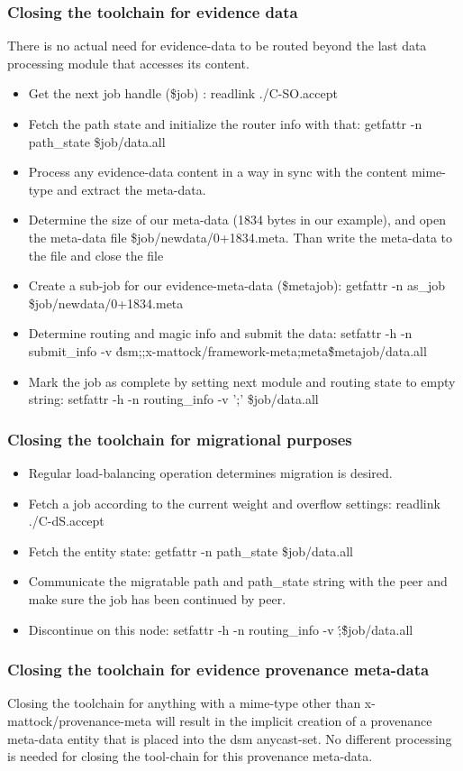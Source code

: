 \subsubsection{Closing the toolchain for evidence data}
There is no actual need for evidence-data to be routed beyond the last data processing module that accesses its content.
\begin{itemize}
\item Get the next job handle (\$job) : readlink \@./C-SO.accept
\item Fetch the path state and initialize the router info with that: getfattr -n path\_state \$job/data.all
\item Process any evidence-data content in a way in sync with the content mime-type and extract the meta-data.
\item Determine the size of our meta-data (1834 bytes in our example), and open the meta-data file \$job/newdata/0+1834.meta. Than write the meta-data to the file and close the file
\item Create a sub-job for our evidence-meta-data (\$metajob): getfattr -n as\_job \$job/newdata/0+1834.meta
\item Determine routing and magic info and submit the data: setfattr -h -n submit\_info -v \'dsm;;x-mattock/framework-meta;meta\' \$metajob/data.all
\item Mark the job as complete by setting next module and routing state to empty string:  setfattr -h -n routing\_info -v ';' \$job/data.all
\end{itemize}
\subsubsection{Closing the toolchain for migrational purposes}
\begin{itemize}
\item Regular load-balancing operation determines migration is desired.
\item Fetch a job according to the current weight and overflow settings: readlink \@./C-dS.accept
\item Fetch the entity state: getfattr -n path\_state \$job/data.all
\item Communicate the migratable path and path\_state string with the peer and make sure the job has been continued by peer.
\item Discontinue on this node: setfattr -h -n routing\_info -v \';\' \$job/data.all
\end{itemize}
\subsubsection{Closing the toolchain for evidence provenance meta-data}
Closing the toolchain for anything with a mime-type other than x-mattock/provenance-meta will result in the implicit creation of a provenance meta-data entity that is placed into the dsm anycast-set. No different processing is needed for closing the tool-chain for this provenance meta-data.

